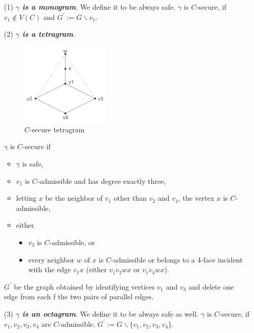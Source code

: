 \begin{itemize}
    \item[(1)] \textit{\textbf{$\gamma$ is a monogram}}. We define it to be always safe. $\gamma$ is $C$-secure, if $v_1 \notin V(C)$ and $G^{'} := G \backslash v_1$.
    \item[(2)] \textit{\textbf{$\gamma$ is a tetragram}}. 
    \begin{figure}[H] %
    \centering %
    \includegraphics[width=0.4\textwidth]{figure/Csecuretetagram.png} 
    \caption{$C$-secure tetragram} %
    \label{figure} %
    \end{figure}
    $\gamma$ is $C$-secure if 
        \begin{itemize}
            \item $\gamma$ is safe,
            \item $v_1$ is $C$-admissible and has degree exactly three,
            \item letting $x$ be the neighbor of $v_1$ other than $v_2$ and $v_4$, the vertex $x$ is $C$-admissible,
            \item either
                \begin{itemize}
                    \item $v_3$ is $C$-admissible, or
                    \item every neighbor $w$ of $x$ is $C$-admissible or belongs to a 4-face incident with the edge $v_1x$ (either $v_1v_2wx$ or $v_1v_4wx$).
                \end{itemize}
        \end{itemize}
        $G^{'}$ be the graph obtained by identifying vertices $v_1$ and $v_3$ and delete one edge from each f the two pairs of parallel edges. 
    \item[(3)] \textit{\textbf{$\gamma$ is an octagram}}. We define it to be always safe as well. $\gamma$ is $C$-secure, if $v_1, v_2, v_3, v_4$ are $C$-admissible. $G^{'} := G \backslash \{v_1, v_2, v_3, v_4\}$.

\end{itemize}
